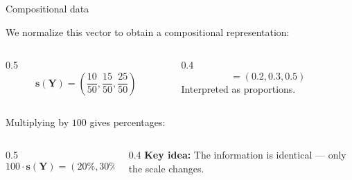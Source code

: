 \begin{frame}{Compositional data}
{  \vspace{0.3cm}
  We normalize this vector to obtain a compositional representation:
  \vspace{0.2cm}

  \begin{columns}
    \begin{column}{0.5\textwidth}
      \[ \mathbf{s}(\mathbf{Y}) = \left(\frac{10}{50}, \frac{15}{50}, \frac{25}{50}\right) \]
    \end{column}
    \begin{column}{0.4\textwidth}
      \[ = (0.2, 0.3, 0.5) \]
      Interpreted as proportions.
    \end{column}
  \end{columns}

  \vspace{0.2cm}
  Multiplying by $100$ gives percentages:
  \vspace{0.2cm}

  \begin{columns}
    \begin{column}{0.5\textwidth}
      \[ 100 \cdot \mathbf{s}(\mathbf{Y}) = (20\%, 30\%, 50\%) \]
    \end{column}
    \begin{column}{0.4\textwidth}
      \textbf{Key idea:} The information is identical --- only the scale changes.
    \end{column}
  \end{columns}
}

\end{frame}


